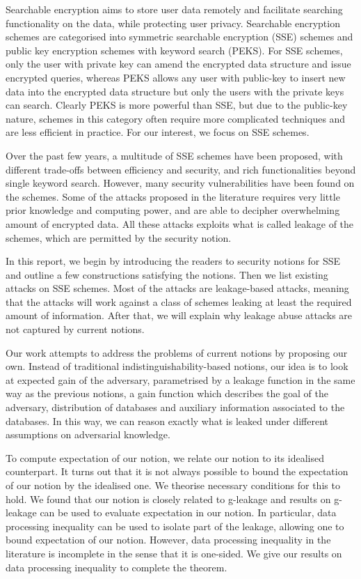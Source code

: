 Searchable encryption aims to store user data remotely and facilitate searching functionality on the data, while protecting user privacy. Searchable encryption schemes are categorised into symmetric searchable encryption (SSE) schemes and public key encryption schemes with keyword search (PEKS). For SSE schemes, only the user with private key can amend the encrypted data structure and issue encrypted queries, whereas PEKS allows any user with public-key to insert new data into the encrypted data structure but only the users with the private keys can search. Clearly PEKS is more powerful than SSE, but due to the public-key nature, schemes in this category often require more complicated techniques and are less efficient in practice. For our interest, we focus on SSE schemes.


Over the past few years, a multitude of SSE schemes have been proposed, with different trade-offs between efficiency and security, and rich functionalities beyond single keyword search. However, many security vulnerabilities have been found on the schemes. Some of the attacks proposed in the literature requires very little prior knowledge and computing power, and are able to decipher overwhelming amount of encrypted data. All these attacks exploits what is called leakage of the schemes, which are permitted by the security notion.


In this report, we begin by introducing the readers to security notions for SSE and outline a few constructions satisfying the notions. Then we list existing attacks on SSE schemes. Most of the attacks are leakage-based attacks, meaning that the attacks will work against a class of schemes leaking at least the required amount of information. After that, we will explain why leakage abuse attacks are not captured by current notions.

Our work attempts to address the problems of current notions by proposing our own. Instead of traditional indistinguishability-based notions, our idea is to look at expected gain of the adversary, parametrised by a leakage function in the same way as the previous notions, a gain function which describes the goal of the adversary, distribution of databases and auxiliary information associated to the databases. In this way, we can reason exactly what is leaked under different assumptions on adversarial knowledge.

To compute expectation of our notion, we relate our notion to its idealised counterpart. It turns out that it is not always possible to bound the expectation of our notion by the idealised one. We theorise necessary conditions for this to hold. We found that our notion is closely related to g-leakage \cite{6266165} and results on g-leakage can be used to evaluate expectation in our notion. In particular, data processing inequality can be used to isolate part of the leakage, allowing one to bound expectation of our notion. However, data processing inequality in the literature is incomplete in the sense that it is one-sided. We give our results on data processing inequality to complete the theorem.